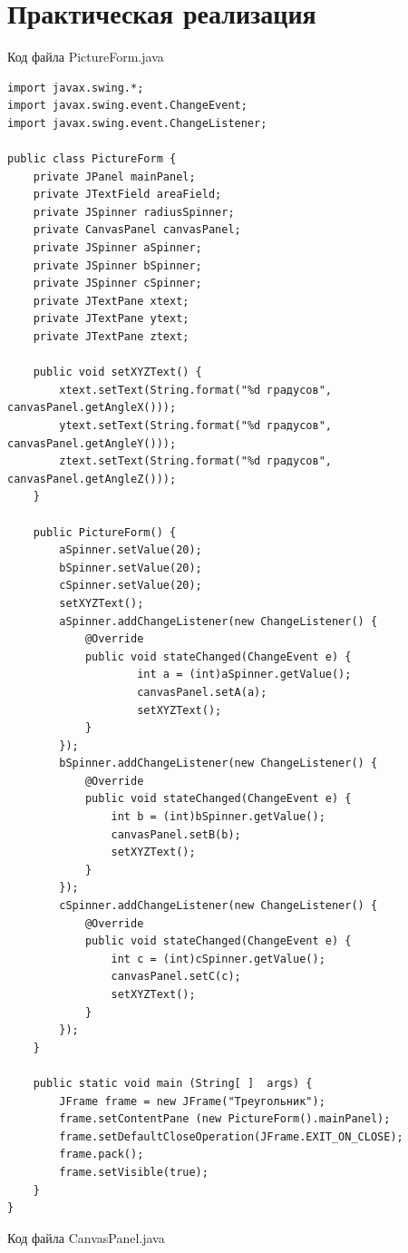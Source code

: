\documentclass[a4paper, 14pt]{extarticle}
\begin{document}
\pagebreak
\section{Практическая реализация}
\par
Код файла PictureForm.java
\begin{lstlisting}
import javax.swing.*;
import javax.swing.event.ChangeEvent;
import javax.swing.event.ChangeListener;

public class PictureForm {
    private JPanel mainPanel;
    private JTextField areaField;
    private JSpinner radiusSpinner;
    private CanvasPanel canvasPanel;
    private JSpinner aSpinner;
    private JSpinner bSpinner;
    private JSpinner cSpinner;
    private JTextPane xtext;
    private JTextPane ytext;
    private JTextPane ztext;

    public void setXYZText() {
        xtext.setText(String.format("%d градусов", canvasPanel.getAngleX()));
        ytext.setText(String.format("%d градусов", canvasPanel.getAngleY()));
        ztext.setText(String.format("%d градусов", canvasPanel.getAngleZ()));
    }

    public PictureForm() {
        aSpinner.setValue(20);
        bSpinner.setValue(20);
        cSpinner.setValue(20);
        setXYZText();
        aSpinner.addChangeListener(new ChangeListener() {
            @Override
            public void stateChanged(ChangeEvent e) {
                    int a = (int)aSpinner.getValue();
                    canvasPanel.setA(a);
                    setXYZText();
            }
        });
        bSpinner.addChangeListener(new ChangeListener() {
            @Override
            public void stateChanged(ChangeEvent e) {
                int b = (int)bSpinner.getValue();
                canvasPanel.setB(b);
                setXYZText();
            }
        });
        cSpinner.addChangeListener(new ChangeListener() {
            @Override
            public void stateChanged(ChangeEvent e) {
                int c = (int)cSpinner.getValue();
                canvasPanel.setC(c);
                setXYZText();
            }
        });
    }

    public static void main (String[ ]  args) {
        JFrame frame = new JFrame("Треугольник");
        frame.setContentPane (new PictureForm().mainPanel);
        frame.setDefaultCloseOperation(JFrame.EXIT_ON_CLOSE);
        frame.pack();
        frame.setVisible(true);
    }
}
\end{lstlisting}
\par
Код файла CanvasPanel.java
\end{document}
